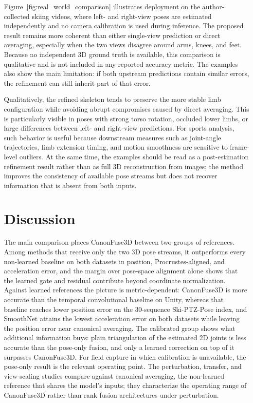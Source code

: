 \documentclass[preprint,12pt]{elsarticle}
\providecommand{\DIFaddbegin}{} %
\providecommand{\DIFaddend}{} %
\providecommand{\DIFadd}[1]{{\protect\color{blue}#1}} %
\begin{document}
Figure~\ref{fig:real_world_comparison} illustrates deployment on the author-collected skiing videos, where left- and right-view poses are estimated independently and no camera calibration is used during inference. The proposed result remains more coherent than either single-view prediction or direct averaging, especially when the two views disagree around arms, knees, and feet. Because no independent 3D ground truth is available, this comparison is qualitative and is not included in any reported accuracy metric. The examples also show the main limitation: if both upstream predictions contain similar errors, the refinement can still inherit part of that error.

Qualitatively, the refined skeleton tends to preserve the more stable limb configuration while avoiding abrupt compromises caused by direct averaging. This is particularly visible in poses with strong torso rotation, occluded lower limbs, or large differences between left- and right-view predictions. For sports analysis, such behavior is useful because downstream measures such as joint-angle trajectories, limb extension timing, and motion smoothness are sensitive to frame-level outliers. At the same time, the examples should be read as a post-estimation refinement result rather than as full 3D reconstruction from images; the method improves the consistency of available pose streams but does not recover information that is absent from both inputs.

\FloatBarrier
\section{Discussion}
\DIFaddbegin \label{sec:discussion}
\DIFaddend 

The  \DIFaddbegin \DIFadd{main comparison places }\DIFaddend CanonFuse3D  \DIFaddbegin \DIFadd{between two groups of references. Among methods that receive only the two 3D pose streams, it outperforms every non-learned baseline }\DIFaddend on both datasets  \DIFaddbegin \DIFadd{in position, Procrustes-aligned, and acceleration error, and the margin over pose-space alignment alone shows that the learned gate and residual contribute beyond coordinate normalization. Against learned references the picture is metric-dependent: CanonFuse3D is more accurate than the temporal convolutional baseline on Unity, whereas that baseline reaches lower position error on the 30-sequence Ski-PTZ-Pose index, and SmoothNet attains the lowest acceleration error on both datasets while leaving the position error near canonical averaging. The calibrated group shows what additional information buys: plain triangulation of the estimated 2D joints is less accurate than the pose-only fusion, and only a learned correction on top of it surpasses CanonFuse3D. For field capture in which calibration is unavailable, the pose-only result is the relevant operating point}\DIFaddend . The  perturbation, transfer, and view-scaling studies  \DIFaddbegin \DIFadd{compare against canonical averaging, the non-learned reference that shares the model's inputs; they characterize the operating range of CanonFuse3D rather than rank fusion architectures under perturbation.
}\DIFaddend 
\end{document}
